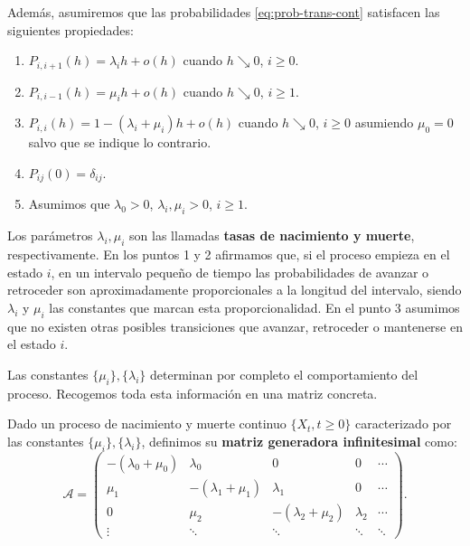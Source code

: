     Además, asumiremos que las probabilidades \eqref{eq:prob-trans-cont} satisfacen las siguientes propiedades:

    \begin{enumerate}
        \item $P_{i,i+1}(h) = \lambda_i h + o(h)$ cuando $h\searrow 0$, $i\geq 0$.
        \item $P_{i,i-1}(h) = \mu_i h + o(h)$ cuando $h\searrow 0$, $i\geq 1$.
        \item $P_{i,i}(h) = 1 - (\lambda_i + \mu_i) h + o(h)$  cuando $h\searrow 0$, $i\geq 0$ asumiendo $\mu_0=0$ salvo que se indique lo contrario.
        \item $P_{ij}(0)=\delta_{ij}$.
        \item Asumimos que $\lambda_0>0$, $\lambda_i, \mu_i > 0$, $i\geq 1$.
    \end{enumerate}

    Los parámetros $\lambda_i, \mu_i$ son las llamadas \textbf{tasas de nacimiento y muerte}, respectivamente. En los puntos 1 y 2 afirmamos que, si el proceso empieza en el estado $i$, en un intervalo pequeño de tiempo las probabilidades de avanzar o retroceder son aproximadamente proporcionales a la longitud del intervalo, siendo $\lambda_i$ y $\mu_i$ las constantes que marcan esta proporcionalidad. En el punto 3 asumimos que no existen otras posibles transiciones que avanzar, retroceder o mantenerse en el estado $i$.

    Las constantes $\{\mu_i\}, \{\lambda_i\}$ determinan por completo el comportamiento del proceso. Recogemos toda esta información en una matriz concreta.
    
    \begin{definicion}
        Dado un proceso de nacimiento y muerte continuo $\{X_t, t\geq 0\}$ caracterizado por las constantes $\{\mu_i\}, \{\lambda_i\}$, definimos su \textbf{matriz generadora infinitesimal} como:
        \begin{equation}
            \label{eq:matrix-generadora}
            \mathcal A = \begin{pmatrix}
                -(\lambda_0+\mu_0) & \lambda_0 & 0 & 0 & \cdots \\
                \mu_1 & -(\lambda_1+\mu_1) & \lambda_1 & 0 & \cdots \\
                0 & \mu_2 & -(\lambda_2+\mu_2) & \lambda_2 & \cdots \\
                \vdots & \ddots & \ddots & \ddots & \ddots
            \end{pmatrix}.
        \end{equation}
    \end{definicion}

